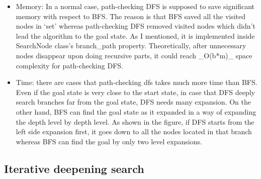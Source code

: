 \documentclass[]{article}
\providecommand{\tightlist}{%
  \setlength{\itemsep}{0pt}\setlength{\parskip}{0pt}}
\begin{document}
\begin{enumerate}
  \begin{itemize}
  \tightlist
  \item
    Memory: In a normal case, path-checking DFS is supposed to save
    significant memory with respect to BFS. The reason is that BFS saved
    all the visited nodes in `set' whereas path-checking DFS removed
    visited nodes which didn't lead the algorithm to the goal state. As
    I mentioned, it is implemented inside SearchNode class's
    branch\_path property. Theoretically, after unnecessary nodes
    disappear upon doing recursive parts, it could reach \_O(b*m)\_
    space complexity for path-checking DFS.
  \item
    Time: there are cases that path-checking dfs takes much more time
    than BFS. Even if the goal state is very close to the start state,
    in case that DFS deeply search branches far from the goal state, DFS
    needs many expansion. On the other hand, BFS can find the goal state
    as it expanded in a way of expanding the depth level by depth level.
    As shown in the figure, if DFS starts from the left side expansion
    first, it goes down to all the nodes located in that branch whereas
    BFS can find the goal by only two level expansions.
  \end{itemize}
\end{enumerate}

\subsection{Iterative deepening
search}\label{iterative-deepening-search}
\end{document}
